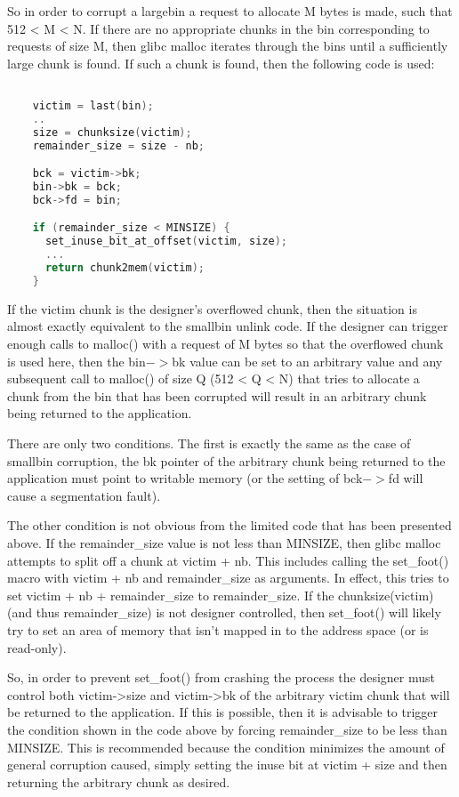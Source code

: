 \documentclass[12pt]{article}
\begin{document}
So in order to corrupt a largebin a request to allocate M bytes is
made, such that 512 < M < N. If there are no appropriate chunks in
the bin corresponding to requests of size M, then glibc malloc
iterates through the bins until a sufficiently large chunk is
found. If such a chunk is found, then the following code is used:
\begin{lstlisting}[language=C]

    victim = last(bin);
    ..
    size = chunksize(victim);
    remainder_size = size - nb;

    bck = victim->bk;
    bin->bk = bck;
    bck->fd = bin;

    if (remainder_size < MINSIZE) {
      set_inuse_bit_at_offset(victim, size);
      ...
      return chunk2mem(victim);
    }
\end{lstlisting}
If the victim chunk is the designer's overflowed chunk, then the
situation is almost exactly equivalent to the smallbin unlink code.
If the designer can trigger enough calls to malloc() with a request
of M bytes so that the overflowed chunk is used here, then the bin$->$bk value can be set to an arbitrary value and any subsequent call
to malloc() of size Q (512 < Q < N)  that tries to allocate a chunk
from the bin that has been corrupted will result in an arbitrary
chunk being returned to the application.
\newline


There are only two conditions. The first is exactly the same as the
case of smallbin corruption, the bk pointer of the arbitrary chunk
being returned to the application must point to writable memory (or
the setting of bck$->$fd will cause a segmentation fault).
\newline


The other condition is not obvious from the limited code that has
been presented above. If the remainder\_size value is not less than
MINSIZE, then glibc malloc attempts to split off a chunk at victim
+ nb. This includes calling the set\_foot() macro with victim + nb
and remainder\_size as arguments. In effect, this tries to set
victim + nb + remainder_size to remainder\_size. If the
chunksize(victim) (and thus remainder\_size) is not designer
controlled, then set\_foot() will likely try to set an area of
memory that isn't mapped in to the address space (or is read-only).
\newline


So, in order to prevent set_foot() from crashing the process the
designer must control both victim->size and victim->bk of the
arbitrary victim chunk that will be returned to the application. If
this is possible, then it is advisable to trigger the condition
shown in the code above by forcing remainder\_size to be less than
MINSIZE. This is recommended because the condition minimizes the
amount of general corruption caused, simply setting the inuse bit
at victim + size and then returning the arbitrary chunk as desired.
\newline
\end{document}
